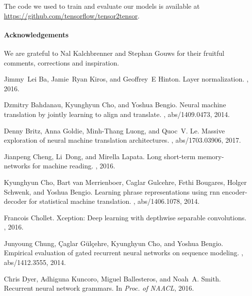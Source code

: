 \documentclass{article}
\begin{document}
The code we used to train and evaluate our models is available at \url{https://github.com/tensorflow/tensor2tensor}.

\paragraph{Acknowledgements} We are grateful to Nal Kalchbrenner and Stephan Gouws for
their fruitful comments, corrections and inspiration.


\begin{thebibliography}{10}

  Jimmy~Lei Ba, Jamie~Ryan Kiros, and Geoffrey~E Hinton.
  \newblock Layer normalization.
  , 2016.

  Dzmitry Bahdanau, Kyunghyun Cho, and Yoshua Bengio.
  \newblock Neural machine translation by jointly learning to align and
  translate.
  , abs/1409.0473, 2014.

  Denny Britz, Anna Goldie, Minh{-}Thang Luong, and Quoc~V. Le.
  \newblock Massive exploration of neural machine translation architectures.
  , abs/1703.03906, 2017.

  Jianpeng Cheng, Li~Dong, and Mirella Lapata.
  \newblock Long short-term memory-networks for machine reading.
  , 2016.

  Kyunghyun Cho, Bart van Merrienboer, Caglar Gulcehre, Fethi Bougares, Holger
  Schwenk, and Yoshua Bengio.
  \newblock Learning phrase representations using rnn encoder-decoder for
  statistical machine translation.
  , abs/1406.1078, 2014.

  Francois Chollet.
  \newblock Xception: Deep learning with depthwise separable convolutions.
  , 2016.

  Junyoung Chung, {\c{C}}aglar G{\"{u}}l{\c{c}}ehre, Kyunghyun Cho, and Yoshua
  Bengio.
  \newblock Empirical evaluation of gated recurrent neural networks on sequence
  modeling.
  , abs/1412.3555, 2014.

  Chris Dyer, Adhiguna Kuncoro, Miguel Ballesteros, and Noah~A. Smith.
  \newblock Recurrent neural network grammars.
  \newblock In {\em Proc. of NAACL}, 2016.


\end{thebibliography}
\end{document}
